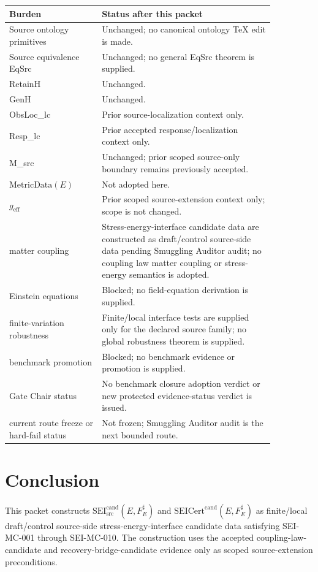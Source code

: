 \documentclass[11pt]{article}
\newcommand{\MetricData}{\mathrm{MetricData}}
\newcommand{\geff}{g_{\mathrm{eff}}}
\newcommand{\SEICand}{\mathrm{SEI}_{\mathrm{src}}^{\mathrm{cand}}}
\newcommand{\SEICertCand}{\mathrm{SEICert}^{\mathrm{cand}}}
\begin{document}
\begin{longtable}{p{0.30\linewidth}p{0.56\linewidth}}
\toprule
Burden & Status after this packet \\
\midrule
Source ontology primitives & Unchanged; no canonical ontology TeX edit is made. \\
Source equivalence EqSrc & Unchanged; no general EqSrc theorem is supplied. \\
RetainH & Unchanged. \\
GenH & Unchanged. \\
ObsLoc\_lc & Prior source-localization context only. \\
Resp\_lc & Prior accepted response/localization context only. \\
M\_src & Unchanged; prior scoped source-only boundary remains previously accepted. \\
\(\MetricData(E)\) & Not adopted here. \\
\(\geff\) & Prior scoped source-extension context only; scope is not changed. \\
matter coupling & Stress-energy-interface candidate data are constructed as draft/control source-side data pending Smuggling Auditor audit; no coupling law matter coupling or stress-energy semantics is adopted. \\
Einstein equations & Blocked; no field-equation derivation is supplied. \\
finite-variation robustness & Finite/local interface tests are supplied only for the declared source family; no global robustness theorem is supplied. \\
benchmark promotion & Blocked; no benchmark evidence or promotion is supplied. \\
Gate Chair status & No benchmark closure adoption verdict or new protected evidence-status verdict is issued. \\
current route freeze or hard-fail status & Not frozen; Smuggling Auditor audit is the next bounded route. \\
\bottomrule
\end{longtable}

\section{Conclusion}

This packet constructs \(\SEICand(E,F_E^\sharp)\) and
\(\SEICertCand(E,F_E^\sharp)\) as finite/local draft/control source-side
stress-energy-interface candidate data satisfying SEI-MC-001 through
SEI-MC-010. The construction uses the accepted coupling-law-candidate and
recovery-bridge-candidate evidence only as scoped source-extension
preconditions.
\end{document}
